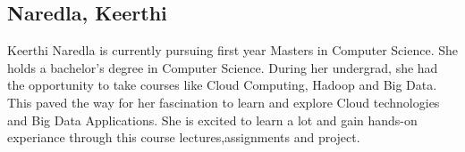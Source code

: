 \subsection{Naredla, Keerthi}

Keerthi Naredla is currently pursuing first year Masters in Computer
Science. She holds a bachelor's degree in Computer Science. During her
undergrad, she had the opportunity to take courses like Cloud
Computing, Hadoop and Big Data. This paved the way for her fascination
to learn and explore Cloud technologies and Big Data Applications. She
is excited to learn a lot and gain hands-on experiance through this
course lectures,assignments and project.
